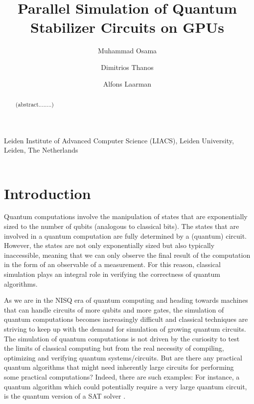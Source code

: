 \documentclass[runningheads]{llncs}
\begin{document}
	
	\title{Parallel Simulation of Quantum Stabilizer Circuits on GPUs}
	
	\author{Muhammad Osama \and Dimitrios Thanos \and Alfons Laarman}
	
	
	\institute
	{
		Leiden Institute of Advanced Computer Science (LIACS), Leiden University, Leiden, The Netherlands\\
		\\
	}
	
	\maketitle            
	
	
	
	
	
	
\begin{abstract}

(abstract........)

\end{abstract}	
	
	 
	
\section{Introduction} %

Quantum computations involve the manipulation of states that are exponentially sized to the number of qubits (analogous to classical bits). The states that are involved in a quantum computation are fully determined by a (quantum) circuit. However, the states are not only exponentially sized but also typically inaccessible, meaning that we can only observe the final result of the computation in the form of an observable of a measurement. For this reason, classical simulation plays an integral role in verifying the correctness of quantum algorithms.

As we are in the NISQ era \cite{preskill2018_nisq} of quantum computing and heading towards machines that can handle circuits of more qubits and more gates, the simulation of quantum computations becomes increasingly difficult and classical techniques are striving to keep up with the demand for simulation of growing quantum circuits. The simulation of quantum computations is not driven by the curiosity to test the limits of classical computing but from the real necessity of compiling, optimizing and verifying quantum systems/circuits. But are there any practical quantum algorithms that might need inherently large circuits for performing some practical computations? Indeed, there are such examples: For instance, a quantum algorithm which could potentially require a very large quantum circuit, is the quantum version of a SAT solver \cite{quantum_sat_solver}. 
\end{document}
